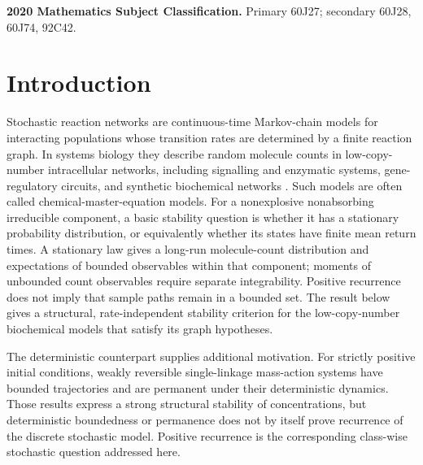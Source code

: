 \medskip
\noindent\textbf{2020 Mathematics Subject Classification.}
Primary 60J27; secondary 60J28, 60J74, 92C42.

\section{Introduction}\label{sec:intro}

Stochastic reaction networks are continuous-time Markov-chain models for
interacting populations whose transition rates are determined by a finite
reaction graph.  In systems biology they describe random molecule counts in
low-copy-number intracellular networks, including signalling and enzymatic
systems, gene-regulatory circuits, and synthetic biochemical networks
\citep{AndersonKurtz2015}.  Such models are often called chemical-master-equation
models.  For a nonexplosive nonabsorbing irreducible component, a basic
stability question
is whether it has a stationary probability distribution, or equivalently
whether its states have finite mean return times.  A stationary law gives a
long-run molecule-count distribution and expectations of bounded observables
within that component; moments of unbounded count observables require separate
integrability.  Positive recurrence does not imply that sample paths remain
in a bounded set.  The result below gives a structural, rate-independent
stability criterion for the low-copy-number biochemical models that satisfy
its graph hypotheses.

The deterministic counterpart supplies additional motivation.  For strictly
positive initial conditions, weakly reversible single-linkage mass-action
systems have bounded trajectories \citep{Anderson2011Boundedness} and are
permanent \citep{BorosHofbauer2020} under their deterministic dynamics.  Those
results express a strong structural stability of concentrations, but
deterministic boundedness or permanence does
not by itself prove recurrence of the discrete stochastic model.  Positive
recurrence is the corresponding class-wise stochastic question addressed
here.

